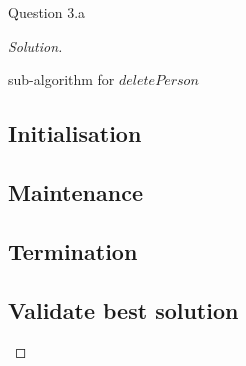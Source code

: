 \begin{solution}{Question 3.a}
\begin{proof}[Solution]
        \begin{algorithm}[H]
            \caption{sub-algorithm for $deletePerson$}
            \begin{algorithmic}[1]
                \EndIf{}
                \EndFor
                \State{\Return{}}
                \EndProcedure{}
            \end{algorithmic}
        \end{algorithm}
        \subsection*{Initialisation}
        \subsection*{Maintenance}
        \subsection*{Termination}
        \subsection*{Validate best solution}
        
    \end{proof}
\end{solution}

